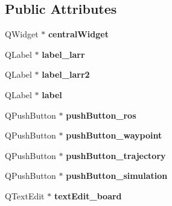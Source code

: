 \subsection*{Public Attributes}
\begin{DoxyCompactItemize}
\item 
Q\+Widget $\ast$ {\bfseries central\+Widget}\hypertarget{class_ui___main_window_a30075506c2116c3ed4ff25e07ae75f81}{}\label{class_ui___main_window_a30075506c2116c3ed4ff25e07ae75f81}

\item 
Q\+Label $\ast$ {\bfseries label\+\_\+larr}\hypertarget{class_ui___main_window_a32587f1e879f5b685d375d2daa20f7a6}{}\label{class_ui___main_window_a32587f1e879f5b685d375d2daa20f7a6}

\item 
Q\+Label $\ast$ {\bfseries label\+\_\+larr2}\hypertarget{class_ui___main_window_a06fc1a01ac3ba3d4d1f75a0e8ab06684}{}\label{class_ui___main_window_a06fc1a01ac3ba3d4d1f75a0e8ab06684}

\item 
Q\+Label $\ast$ {\bfseries label}\hypertarget{class_ui___main_window_ad9c89133780f28e6efa2ec17ceb9cff5}{}\label{class_ui___main_window_ad9c89133780f28e6efa2ec17ceb9cff5}

\item 
Q\+Push\+Button $\ast$ {\bfseries push\+Button\+\_\+ros}\hypertarget{class_ui___main_window_a2667c2b4f9c61bf9895b73d07d4b5172}{}\label{class_ui___main_window_a2667c2b4f9c61bf9895b73d07d4b5172}

\item 
Q\+Push\+Button $\ast$ {\bfseries push\+Button\+\_\+waypoint}\hypertarget{class_ui___main_window_a6b5d7c0f96cdb3276a33746fbcd7e8c7}{}\label{class_ui___main_window_a6b5d7c0f96cdb3276a33746fbcd7e8c7}

\item 
Q\+Push\+Button $\ast$ {\bfseries push\+Button\+\_\+trajectory}\hypertarget{class_ui___main_window_a9d644554288462450d209192c1998095}{}\label{class_ui___main_window_a9d644554288462450d209192c1998095}

\item 
Q\+Push\+Button $\ast$ {\bfseries push\+Button\+\_\+simulation}\hypertarget{class_ui___main_window_afd109ead0ad1ae7ae67ad1df803c9c38}{}\label{class_ui___main_window_afd109ead0ad1ae7ae67ad1df803c9c38}

\item 
Q\+Text\+Edit $\ast$ {\bfseries text\+Edit\+\_\+board}\hypertarget{class_ui___main_window_af13441b9fd874f1aeb2ec5cefaeb0bce}{}\label{class_ui___main_window_af13441b9fd874f1aeb2ec5cefaeb0bce}


\end{DoxyCompactItemize}
